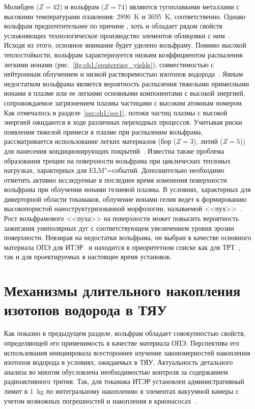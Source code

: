 Молибден ($Z=42$) и вольфрам ($Z=74$) являются тугоплавкими металлами с высокими температурами плавления: \SI{2896}{\kelvin} и \SI{3695}{\kelvin}, соответственно. Однако вольфрам предпочтительнее по причине , хоть и обладает рядом свойств усложняющих технологическое производство элементов облицовки с ним~\cite{Piskarev2024}. Исходя из этого, основное внимание будет уделено вольфраму. Помимо высокой теплостойкости, вольфрам характеризуется низким коэффициентом распыления легкими ионами (рис.~\cref{fig:ch1/sputerring_yields}), совместимостью с нейтронным облучением и низкой растворимостью изотопов водорода~\cite{Roth2011, Pintsuk2012,Rieth2019}. Явным недостатком вольфрама является вероятность распыления тяжелыми примесными ионами в плазме или ее легкими основными компонентами с высокой энергией, сопровождаемое загрязнением плазмы частицами с высоким атомным номером. Как отмечалось в разделе~\cref{sec:ch1/sec1}, потоки частиц плазмы с высокой энергией ожидаются в ходе различных переходных процессов. Учитывая риски появления тяжелой примеси в плазме при распылении вольфрама, рассматривается использование легких материалов (бор ($Z=3$), литий ($Z=5$)) для нанесения кондиционирующих покрытий~\cite{Winter1996,Wauters2020}. Известна также проблема образования трещин на поверхности вольфрама при циклических тепловых нагрузках, характерных для ELM"=событий. Дополнительно необходимо отметить активно исследуемые в последнее время изменения поверхности вольфрама при облучении ионами гелиевой плазмы. В условиях, характерных для диверторной области токамаков, облучение ионами гелия ведет к формированию высокопористой наноструктуризованной морфологии, называемой <<пух>>~\cite{Ueda2018,Kajita2018,Fedorovich2019,hammond2017helium,Kajita2020,Wright2022}. Рост вольфрамового <<пуха>> на поверхности может повысить вероятность зажигания униполярных дуг с соответствующем увеличением уровня эрозии поверхности. Невзирая на недостатки вольфрама, он выбран в качестве основного материала ОПЭ для ИТЭР~\cite{Pitts2025} и находится в приоритетном списке как для ТРТ~\cite{Piskarev2024}, так и для проектируемых в настоящее время установок. 

\section{Механизмы длительного накопления изотопов водорода в ТЯУ}\label{sec:ch1/sec3}
Как показно в предыдущем разделе, вольфрам обладает совокупностью свойств, определяющей его применимость в качестве материала ОПЭ. Перспектива его использования инициировала всестороннее изучение закономерностей накопления изотопов водорода в условиях, ожидаемых в ТЯУ. Актуальность детального анализа во многом обусловлена необходимостью контроля за содержанием радиоактивного трития. Так, для токамака ИТЭР установлен административный лимит в \SI{1}{\kilogram} по интегральному накоплению в элементах вакуумной камеры с учетом возможных погрешностей и накопления в крионасосах~\cite{Roth1}.

